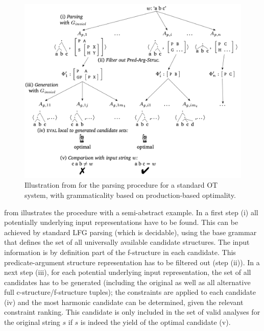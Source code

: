 \documentclass[output=paper,hidelinks]{langscibook}
\begin{document}
\begin{figure}[ht]
    \centering
    \includegraphics[scale=.45]{figures/OT/OT-parsing-figure.pdf}
\caption{Illustration from \citet[173]{Kuhn-CSLI-book} for the parsing procedure for a standard OT system, with grammaticality based on production-based optimality.}
\label{fig:OT-parsing}
\end{figure}


 from \citet[173]{Kuhn-CSLI-book} illustrates the procedure with a semi-ab\-stract example.
In a first step
(i) all potentially underlying input representations have to be found. This can be achieved by standard LFG parsing (which is decidable), using the base grammar that defines the set of all universally available candidate structures. The input information is by definition part of the f-structure in each candidate. This predicate-argument structure representation has to be filtered out
(step (ii)). In a next step
(iii), for each potential underlying input representation, the set of all candidates has to be generated (including the original as well as all alternative full c-structure/f-structure tuples); the constraints are applied to each candidate
(iv) and the most harmonic candidate can be determined, given the relevant constraint ranking. This candidate is only included in the set of valid analyses for the original string $s$ if $s$ is indeed the yield of the optimal candidate (v).
\end{document}
